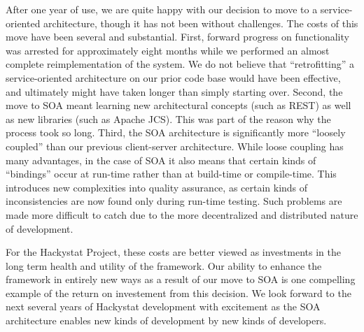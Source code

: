 \documentclass[conference,compsoc,peerreview]{IEEEtran}
\begin{document}
After one year of use, we are quite happy with our decision to move to a
service-oriented architecture, though it has not been without challenges.
The costs of this move have been several and substantial.  First, forward
progress on functionality was arrested for approximately eight months while
we performed an almost complete reimplementation of the system.  We do not
believe that ``retrofitting'' a service-oriented architecture on our prior
code base would have been effective, and ultimately might have taken longer
than simply starting over.  Second, the move to SOA meant learning new
architectural concepts (such as REST) as well as new libraries (such as
Apache JCS).  This was part of the reason why the process took so long.
Third, the SOA architecture is significantly more ``loosely coupled'' than
our previous client-server architecture.  While loose coupling has many
advantages, in the case of SOA it also means that certain kinds of
``bindings'' occur at run-time rather than at build-time or compile-time.
This introduces new complexities into quality assurance, as certain kinds
of inconsistencies are now found only during run-time testing.  Such
problems are made more difficult to catch due to the more decentralized and
distributed nature of development.

For the Hackystat Project, these costs are better viewed as investments in
the long term health and utility of the framework.  Our ability to enhance
the framework in entirely new ways as a result of our move to SOA is one
compelling example of the return on investement from this decision.  We
look forward to the next several years of Hackystat development with
excitement as the SOA architecture enables new kinds of development by new
kinds of developers.



\end{document}
